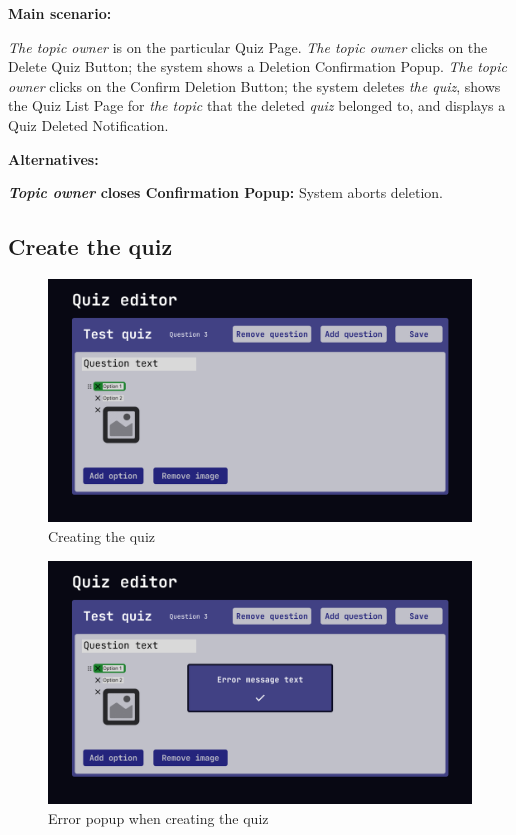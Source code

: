 \documentclass[
    english, %
]{VUMIFPSkursinis}
\begin{document}
\noindent\textbf{\fontsize{13}{15}\selectfont Main scenario:}

\textit{The topic owner} is on the particular Quiz Page. \textit{The topic owner} clicks on the Delete Quiz Button; the system shows a Deletion Confirmation Popup. \textit{The topic owner} clicks on the Confirm Deletion Button; the system deletes \textit{the quiz}, shows the Quiz List Page for \textit{the topic} that the deleted \textit{quiz} belonged to, and displays a Quiz Deleted Notification.

\noindent\textbf{\fontsize{13}{15}\selectfont Alternatives:}

\textbf{\textit{Topic owner} closes Confirmation Popup:} System aborts deletion.

\subsection{Create the quiz}

\begin{figure}[ht]
    \centering
    \includegraphics[width=\textwidth]{../lab3diags/Quiz creation.png}
    \caption{Creating the quiz}
    \label{wireframe-quiz-creation}
\end{figure}

\begin{figure}[ht]
    \centering
    \includegraphics[width=\textwidth]{../lab3diags/Quiz creation error.png}
    \caption{Error popup when creating the quiz}
    \label{wireframe-quiz-creation-error}
\end{figure}
\end{document}
